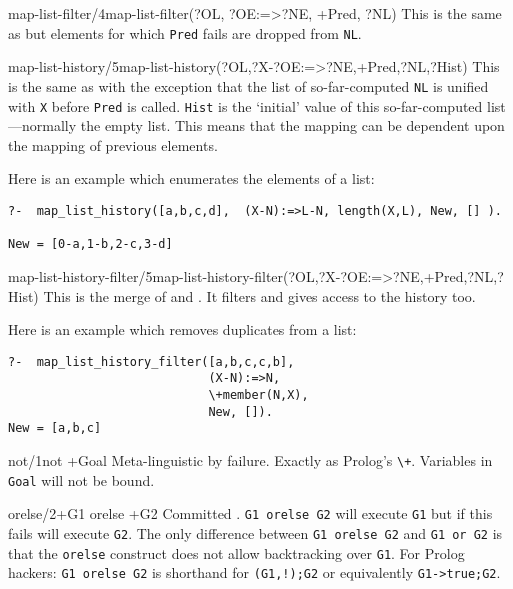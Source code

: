 \begin{predicate}{map-list-filter/4}{map-list-filter(?OL, ?OE:=>?NE, +Pred, ?NL)}%
This is the same as  but elements for which \verb|Pred|
fails are dropped from \verb|NL|.
\end{predicate}

\begin{predicate}{map-list-history/5}{map-list-history(?OL,?X-?OE:=>?NE,+Pred,?NL,?Hist)}%
This is the same as  with the exception that the list of
so-far-computed \verb|NL| is unified with \verb|X| before
\verb|Pred| is called.  \verb|Hist| is the `initial' value of this
so-far-computed list---normally the empty list.  This means that the
mapping can be dependent upon the mapping of previous elements.


Here is an example which enumerates the elements of a list:
\begin{verbatim}
?-  map_list_history([a,b,c,d],  (X-N):=>L-N, length(X,L), New, [] ).

New = [0-a,1-b,2-c,3-d] 
\end{verbatim}
\end{predicate}


\begin{predicate}{map-list-history-filter/5}{map-list-history-filter(?OL,?X-?OE:=>?NE,+Pred,?NL,?Hist)}%
This is the merge of  and .
It filters and gives access to the history too.  

Here is an example which removes duplicates from a list:
\begin{verbatim}
?-  map_list_history_filter([a,b,c,c,b],
                            (X-N):=>N,
                            \+member(N,X),
                            New, []).
New = [a,b,c]
\end{verbatim}
\end{predicate}

\begin{predicate}{not/1}{not +Goal}%
Meta-linguistic  by failure. Exactly as Prolog's
\verb'\+'.  Variables in {\tt Goal} will not be bound.
\end{predicate}

\begin{predicate}{orelse/2}{+G1 orelse +G2}%
Committed . {\tt G1 orelse G2} will execute
{\tt G1} but if this fails will execute {\tt G2}. The only difference
between {\tt G1 orelse G2} and {\tt G1 or G2} is that the {\tt orelse}
construct does not allow backtracking over {\tt G1}. For Prolog
hackers: {\tt G1 orelse G2} is shorthand for {\tt (G1,!);G2} or
equivalently {\tt G1->true;G2}. 
\end{predicate}

